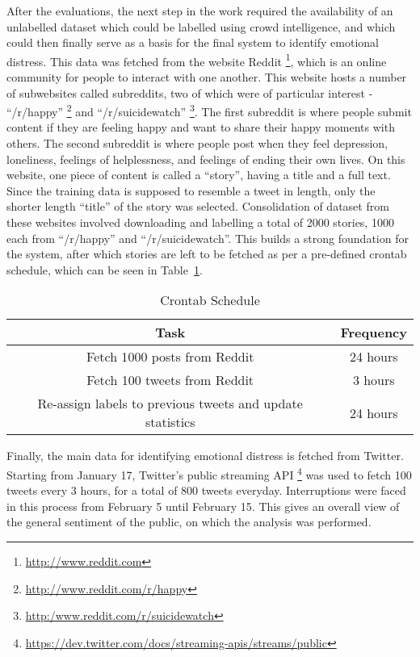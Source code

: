 After the evaluations, the next step in the work required the availability of an unlabelled dataset which could be labelled using crowd intelligence, and which could then finally serve as a basis for the final system to identify emotional distress. This data was fetched from the website Reddit \footnote{\url{http://www.reddit.com}}, which is an online community for people to interact with one another. This website hosts a number of subwebsites called subreddits, two of which were of particular interest - ``/r/happy'' \footnote{\url{http://www.reddit.com/r/happy}} and ``/r/suicidewatch'' \footnote{\url{http:/www.reddit.com/r/suicidewatch}}. The first subreddit is where people submit content if they are feeling happy and want to share their happy moments with others. The second subreddit is where people post when they feel depression, loneliness, feelings of helplessness, and feelings of ending their own lives. On this website, one piece of content is called a ``story'', having a title and a full text. Since the training data is supposed to resemble a tweet in length, only the shorter length ``title'' of the story was selected. Consolidation of dataset from these websites involved downloading and labelling a total of 2000 stories, 1000 each from ``/r/happy'' and ``/r/suicidewatch''. This builds a strong foundation for the system, after which stories are left to be fetched as per a pre-defined crontab schedule, which can be seen in Table~\ref{tab:cron_schedule}.\\

\begin{table}
    \begin{center}
        \begin{tabular}{ | c | c | }
            \hline
            \textbf{Task} & \textbf{Frequency} \\
            \hline
            Fetch 1000 posts from Reddit & 24 hours \\
            \hline
            Fetch 100 tweets from Reddit & 3 hours \\
            \hline
            Re-assign labels to previous tweets and update statistics & 24 hours \\
            \hline
        \end{tabular}
    \end{center}
    \caption{Crontab Schedule}
    \label{tab:cron_schedule}
\end{table}

Finally, the main data for identifying emotional distress is fetched from Twitter. Starting from January 17, Twitter's public streaming API \footnote{\url{https://dev.twitter.com/docs/streaming-apis/streams/public}} was used to fetch 100 tweets every 3 hours, for a total of 800 tweets everyday. Interruptions were faced in this process from February 5 until February 15. This gives an overall view of the general sentiment of the public, on which the analysis was performed.

